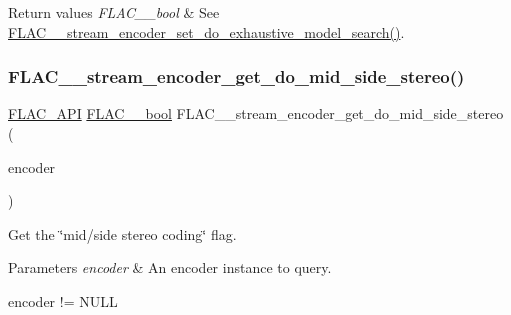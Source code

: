 \begin{DoxyRetVals}{Return values}
{\em F\+L\+A\+C\+\_\+\+\_\+bool} & See \hyperlink{group__flac__stream__encoder_ga7fbc05ec9abd249a400fccb9f189e55e}{F\+L\+A\+C\+\_\+\+\_\+stream\+\_\+encoder\+\_\+set\+\_\+do\+\_\+exhaustive\+\_\+model\+\_\+search()}. \\
\hline
\end{DoxyRetVals}
\mbox{\label{group__flac__stream__encoder_ga3308e73db9d0ae4803485c35d2a54a2d}} 
\subsubsection{\texorpdfstring{F\+L\+A\+C\+\_\+\+\_\+stream\+\_\+encoder\+\_\+get\+\_\+do\+\_\+mid\+\_\+side\+\_\+stereo()}{FLAC\_\_stream\_encoder\_get\_do\_mid\_side\_stereo()}}
{\footnotesize\ttfamily \hyperlink{group__flac__export_ga56ca07df8a23310707732b1c0007d6f5}{F\+L\+A\+C\+\_\+\+A\+PI} \hyperlink{ordinals_8h_a95103469f1cbd78b8cf250194985b34e}{F\+L\+A\+C\+\_\+\+\_\+bool} F\+L\+A\+C\+\_\+\+\_\+stream\+\_\+encoder\+\_\+get\+\_\+do\+\_\+mid\+\_\+side\+\_\+stereo (\begin{DoxyParamCaption}\item[{\hyperlink{zconf_8h_a2c212835823e3c54a8ab6d95c652660e}{const} \hyperlink{struct_f_l_a_c_____stream_encoder}{F\+L\+A\+C\+\_\+\+\_\+\+Stream\+Encoder} $\ast$}]{encoder }\end{DoxyParamCaption})}

Get the \char`\"{}mid/side stereo coding\char`\"{} flag.


\begin{DoxyParams}{Parameters}
{\em encoder} & An encoder instance to query.  
\begin{DoxyCode}
encoder != NULL 
\end{DoxyCode}
 \\
\hline
\end{DoxyParams}

